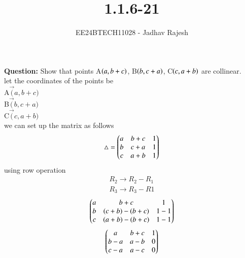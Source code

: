 \documentclass[journal]{IEEEtran}
\begin{document}

\vspace{3cm}
\title{1.1.6-21}
\author{EE24BTECH11028 - Jadhav Rajesh}
{\let\newpage\relax\maketitle}

\renewcommand{\thefigure}{\theenumi}
\renewcommand{\thetable}{\theenumi}
\setlength{\intextsep}{10pt} %


\renewcommand{\thetable}{\theenumi}
 \textbf{Question:} Show that points A$\left(a,b+c\right)$, B$\left(b,c+a\right)$, C$\left(c,a+b\right)$ are collinear.\\
 \solution let the coordinates of the points be \\
              A$\vec(a,b+c)$\\
              B$\vec(b,c+a)$\\
              C$\vec(c,a+b)$\\
        we can set up the matrix as follows\\
    \begin{align}
          \triangle = \begin{pmatrix}
                              a & b+c & 1\\
                              b & c+a & 1\\
                              c & a+b & 1\end{pmatrix}
    \end{align} 
    using row operation\\
    \begin{align}
                   R_{2}\rightarrow{R_{2}-R_{1}}\\
                   R_{3}\rightarrow{R_{3}-R{1}}
    \end{align}
    \begin{align}
                  \begin{pmatrix}
                         a & b+c & 1\\
                         b & \mathbf(c+b)-\mathbf(b+c) & 1-1\\
                         c & \mathbf(a+b)-\mathbf(b+c) & 1-1\end{pmatrix}
    \end{align}
    \begin{align}
                    \begin{pmatrix}
                            a & b+c & 1\\
                            b-a & a-b & 0\\
                            c-a & a-c & 0\end{pmatrix}
    \end{align}
\end{document}
